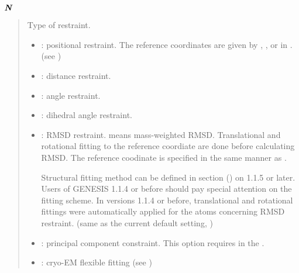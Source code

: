 \documentclass[a4paper,11pt,oneside,english]{sphinxmanual}
\begin{document}
\(\textbf{\textit{N}}\) 
\begin{quote}


Type of restraint.
\begin{itemize}
\item {} 
: positional restraint. The reference coordinates are given
by , , or  in \sphinxstylestrong{{[}INPUT{]}}.
(see {\hyperref[\detokenize{03_Input:input}]{}})

\item {} 
: distance restraint.

\item {} 
: angle restraint.

\item {} 
: dihedral angle restraint.

\item {} 
: RMSD restraint.  means mass-weighted RMSD.
Translational and rotational fitting to the reference coordiate
are done before calculating RMSD. The reference coodinate is specified
in the same manner as .

Structural fitting method can be defined in \sphinxstylestrong{{[}FITTING{]}} section
({\hyperref[\detokenize{13_Fitting:fitting}]{}}) on 1.1.5 or later. Users of GENESIS 1.1.4 or before
should pay special attention on the fitting scheme.
In versions 1.1.4 or before, translational and rotational fittings
were automatically applied for the atoms concerning RMSD restraint.
(same as the current default setting, )

\item {} 
: principal component constraint. This option
requires  in the {\hyperref[\detokenize{03_Input:input}]{}}.

\item {} 
: cryo-EM flexible fitting (see {\hyperref[\detokenize{19_Experiments:experiments}]{}})


\end{itemize}
\end{quote}
\end{document}
